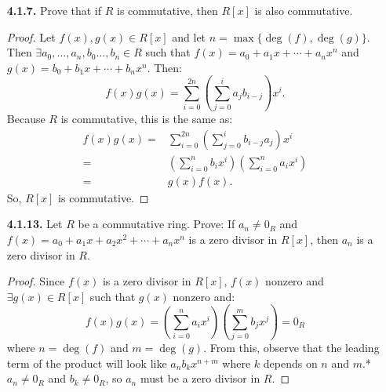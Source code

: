 \documentclass[12pt]{article}
\begin{document}
\begin{itemize}
\begin{proof}
  \dots
\end{proof}

\item[\textbf{ 4.1.7.}] Prove that if $R$ is commutative, then $R[x]$ is also commutative.

\begin{proof}
  Let $f(x), g(x)\in R[x]$ and let $n={\max}\{\deg(f), \deg(g)\}$.
  Then $\exists a_0,\dotsc, a_n,b_0\dotsc,b_n\in R$ such that $f(x) = a_0 + a_1x + \dotsb + {a_n}x^n$ and $g(x) = b_0 + b_1x + \dotsb + {b_n}x^n$.
  Then:
  \[
    f(x) g(x) = \sum_{i=0}^{2n}\left( \sum_{j=0}^{i} {a_j}b_{i-j}\right) x^i\text{.}
  \]
  Because $R$ is commutative, this is the same as:
  \begin{align*}
    f(x) g(x) =& \sum_{i=0}^{2n}\left( \sum_{j=0}^{i} b_{i-j}{a_j}\right) x^i\\
    =& \left( \sum_{i=0}^{n} b_{i} x^i \right) \left( \sum_{i=0}^{n} a_{i} x^i \right)\\
    =& g(x) f(x)\text{.}
  \end{align*}
  So, $R[x]$ is commutative.
\end{proof}

\item[\textbf{ 4.1.13.}] Let $R$ be a commutative ring. Prove: If $a_n\ne0_R$ and $f (x)=a_0+a_1x+a_2x^2+\dotsb+{a_n}x^n$ is a zero divisor in $R[x]$, then $a_n$ is a zero divisor in $R$.

\begin{proof}
  Since $f(x)$ is a zero divisor in $R[x]$, $f(x)$ nonzero and $\exists g(x) \in R[x]$ such that $g(x)$ nonzero and:
  \[
    f(x) g(x) = \left(\sum_{i=0}^{n} {a_i}{x^i}\right) \left(\sum_{j=0}^{m} {b_j}{x^j}\right) = 0_R
  \]
  where $n=\deg(f)$ and $m=\deg(g)$.
  From this, observe that the leading term of the product will look like $a{_n}b{_k}x^{n+m}$ where $k$ depends on $n$ and $m$.*
  $a_n\ne0_R$ and $b_k\neq0_R$, so $a_n$ must be a zero divisor in $R$.
\end{proof}

\end{itemize}
\end{document}
